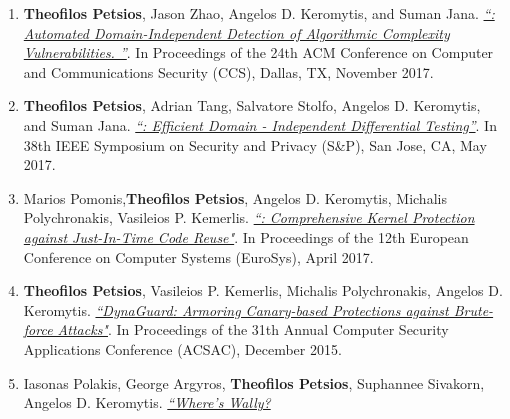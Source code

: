 


\begin{cvparagraph}
\begin{enumerate}[label=C\arabic*]
    \item \textbf{Theofilos Petsios}, Jason Zhao,  Angelos D. Keromytis, and Suman Jana.
        \href{http://www.cs.columbia.edu/~theofilos/files/papers/2017/slowfuzz.pdf}{\textit{``\slowfuzz: Automated Domain-Independent Detection of
        Algorithmic Complexity Vulnerabilities. ''}}. In
        Proceedings of the 24th ACM Conference on Computer and Communications
        Security (CCS), Dallas, TX, November 2017.\label{itm:slowfuzz}
    \item \textbf{Theofilos Petsios}, Adrian Tang, Salvatore Stolfo, Angelos D.
        Keromytis, and Suman Jana.
        \href{http://www.cs.columbia.edu/~theofilos/files/papers/2017/nezha.pdf}{\textit{``\nezha: Efficient Domain - Independent
        Differential Testing''}}. In 38th IEEE Symposium on Security and Privacy
        (S\&P), San Jose, CA, May 2017.\label{itm:nezha}
    \item Marios Pomonis,\textbf{Theofilos Petsios}, Angelos D. Keromytis,
        Michalis Polychronakis, Vasileios P. Kemerlis.
        \href{http://www.cs.columbia.edu/~theofilos/files/papers/2017/krx.pdf}
        {\textit{``\krx: Comprehensive
        Kernel Protection against Just-In-Time Code Reuse"}}. In Proceedings
        of the 12th European Conference on Computer Systems (EuroSys),
        April 2017.\label{itm:krx}
    \item \textbf{Theofilos Petsios}, Vasileios P. Kemerlis, Michalis
        Polychronakis, Angelos D. Keromytis. \href{http://www.cs.columbia.edu/~theofilos/files/papers/2015/dynaguard.pdf}{\textit{``DynaGuard: Armoring
        Canary-based Protections against Brute-force Attacks"}}. In Proceedings
        of the 31th Annual Computer Security Applications Conference (ACSAC),
        December 2015.\label{itm:dynaguard}
    \item Iasonas Polakis, George Argyros, \textbf{Theofilos Petsios},
        Suphannee Sivakorn, Angelos D. Keromytis. \href{http://www.cs.columbia.edu/~theofilos/files/papers/2015/ccs2015.pdf}{\textit{``Where’s Wally?
}}
\end{enumerate}
\end{cvparagraph}
